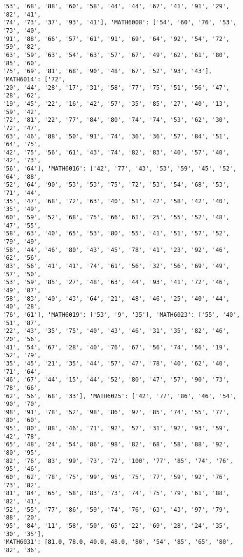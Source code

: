 \documentclass[11pt]{article}
\begin{document}
\begin{Verbatim}[commandchars=\\\{\}]
'53', '68', '88', '60', '58', '44', '44', '67', '41', '91', '29', '82', '41',
'74', '73', '37', '93', '41'], 'MATH6008': ['54', '60', '76', '53', '73', '40',
'91', '88', '66', '57', '61', '91', '69', '64', '92', '54', '72', '59', '82',
'63', '59', '63', '54', '63', '57', '67', '49', '62', '61', '80', '85', '60',
'75', '69', '81', '68', '90', '48', '67', '52', '93', '43'], 'MATH6014': ['72',
'20', '44', '28', '17', '31', '58', '77', '75', '51', '56', '47', '28', '62',
'19', '45', '22', '16', '42', '57', '35', '85', '27', '40', '13', '59', '42',
'72', '81', '22', '77', '84', '80', '74', '74', '53', '62', '30', '72', '47',
'63', '46', '88', '50', '91', '74', '36', '36', '57', '84', '51', '64', '75',
'42', '75', '56', '61', '43', '74', '82', '83', '40', '57', '40', '42', '73',
'56', '64'], 'MATH6016': ['42', '77', '43', '53', '59', '45', '52', '64', '88',
'52', '64', '90', '53', '53', '75', '72', '53', '54', '68', '53', '71', '44',
'35', '47', '68', '72', '63', '40', '51', '42', '58', '42', '40', '35', '49',
'60', '59', '52', '68', '75', '66', '61', '25', '55', '52', '48', '47', '55',
'58', '63', '40', '65', '53', '80', '55', '41', '51', '57', '52', '79', '49',
'58', '44', '46', '80', '43', '45', '78', '41', '23', '92', '46', '62', '56',
'83', '56', '41', '41', '74', '61', '56', '32', '56', '69', '49', '57', '50',
'53', '59', '85', '27', '48', '63', '44', '93', '41', '72', '46', '49', '87',
'58', '83', '40', '43', '64', '21', '48', '46', '25', '40', '44', '40', '28',
'76', '61'], 'MATH6019': ['53', '9', '35'], 'MATH6023': ['55', '40', '51', '87',
'22', '43', '35', '75', '40', '43', '46', '31', '35', '82', '46', '20', '56',
'41', '54', '67', '28', '40', '76', '67', '56', '74', '56', '19', '52', '79',
'35', '45', '21', '35', '44', '57', '47', '78', '40', '62', '40', '71', '64',
'46', '67', '44', '15', '44', '52', '80', '47', '57', '90', '73', '78', '66',
'62', '56', '68', '33'], 'MATH6025': ['42', '77', '86', '46', '54', '90', '70',
'98', '91', '78', '52', '98', '86', '97', '85', '74', '55', '77', '80', '60',
'95', '80', '88', '46', '71', '92', '57', '31', '92', '93', '59', '42', '78',
'65', '48', '24', '54', '86', '98', '82', '68', '58', '88', '92', '80', '95',
'82', '76', '83', '99', '73', '72', '100', '77', '85', '74', '76', '95', '46',
'60', '62', '78', '75', '99', '95', '75', '77', '59', '92', '76', '73', '82',
'81', '84', '65', '58', '83', '73', '74', '75', '79', '61', '88', '82', '41',
'52', '55', '77', '86', '59', '74', '76', '63', '43', '97', '79', '88', '20',
'95', '84', '11', '58', '50', '65', '22', '69', '28', '24', '35', '30', '35'],
'MATH6031': [81.0, 78.0, 40.0, 48.0, '80', '54', '85', '65', '80', '82', '36',

\end{Verbatim}
\end{document}
